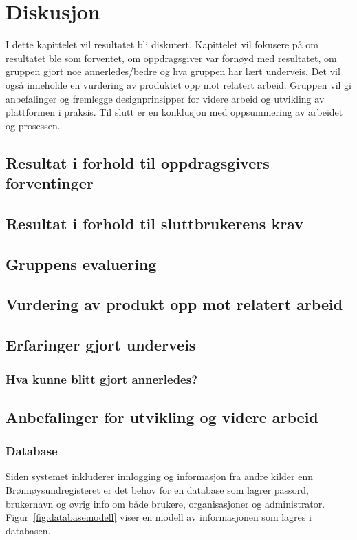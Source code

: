 \cleardoublepage
\chapter{Diskusjon}
\label{chap:discussion} 

I dette kapittelet vil resultatet bli diskutert. Kapittelet vil fokusere på om resultatet ble som forventet, om oppdragsgiver var fornøyd med resultatet, om gruppen gjort noe annerledes/bedre og hva gruppen har lært underveis. Det vil også inneholde en vurdering av produktet opp mot relatert arbeid. Gruppen vil gi anbefalinger og fremlegge designprinsipper for videre arbeid og utvikling av plattformen i praksis. Til slutt er en konklusjon med oppsummering av arbeidet og prosessen.

\section{Resultat i forhold til oppdragsgivers forventinger}

\section{Resultat i forhold til sluttbrukerens krav}

\section{Gruppens evaluering}

\section{Vurdering av produkt opp mot relatert arbeid}

\section{Erfaringer gjort underveis}
\subsection{Hva kunne blitt gjort annerledes?}

\section{Anbefalinger for utvikling og videre arbeid}
\subsection{Database}
Siden systemet inkluderer innlogging og informasjon fra andre kilder enn Brønnøysundregisteret er det behov for en database som lagrer passord, brukernavn og øvrig info om både brukere, organisasjoner og administrator. Figur~\ref{fig:databasemodell} viser en modell av informasjonen som lagres i databasen.

